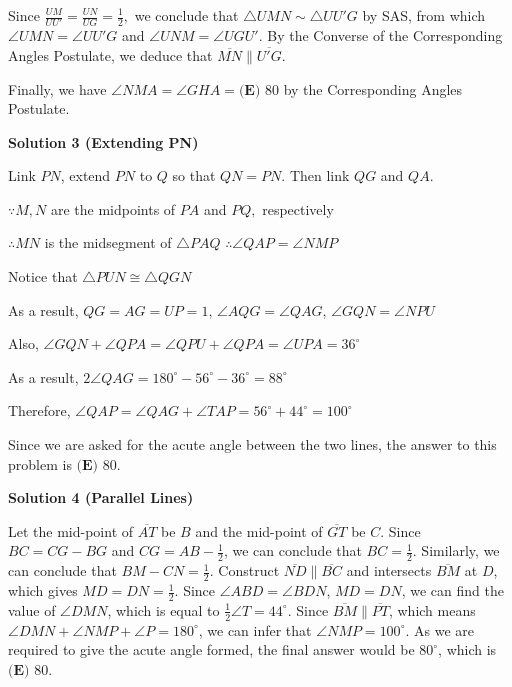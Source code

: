 \begin{enumerate}
 Since $\frac{UM}{UU'}=\frac{UN}{UG}=\frac12,$ we conclude that $\triangle UMN\sim\triangle UU'G$ by SAS, from which $\angle UMN=\angle UU'G$ and $\angle UNM=\angle UGU'.$ By the Converse of the Corresponding Angles Postulate, we deduce that $\overline{MN}\parallel\overline{U'G}.$

 Finally, we have $\angle NMA=\angle GHA=\boxed{\textbf{(E) } 80}$ by the Corresponding Angles Postulate.

 



\textbf{Solution 3 (Extending PN)}

Link $PN$, extend $PN$ to $Q$ so that $QN=PN$. Then link $QG$ and $QA$. 

 $\because M,N$ are the midpoints of $PA$ and $PQ,$ respectively

 $\therefore MN$ is the midsegment of $\bigtriangleup PAQ$
$\therefore \angle QAP=\angle NMP$

 Notice that $\bigtriangleup PUN\cong \bigtriangleup QGN$

 As a result, $QG=AG=UP=1$, $\angle AQG=\angle QAG$, $\angle GQN=\angle NPU$

 Also, $\angle GQN+\angle QPA=\angle QPU+\angle QPA=\angle UPA=36^{\circ}$

 As a result, $2\angle QAG=180^{\circ}-56^{\circ}-36^{\circ}=88^{\circ}$

 Therefore, $\angle QAP=\angle QAG+\angle TAP=56^{\circ}+44^{\circ}=100^{\circ}$

 Since we are asked for the acute angle between the two lines, the answer to this problem is $\boxed{\textbf{(E) } 80}$.

 



\textbf{Solution 4 (Parallel Lines)}

Let the mid-point of $\overline{AT}$ be $B$ and the mid-point of $\overline{GT}$ be $C$. Since $BC=CG-BG$ and $CG=AB-\frac{1}{2}$, we can conclude that $BC=\frac{1}{2}$. Similarly, we can conclude that $BM-CN=\frac{1}{2}$. Construct $\overline{ND}\parallel\overline{BC}$ and intersects $\overline{BM}$ at $D$, which gives $MD=DN=\frac{1}{2}$. Since $\angle{ABD}=\angle{BDN}$, $MD=DN$, we can find the value of $\angle{DMN}$, which is equal to $\frac{1}{2}\angle T=44^{\circ}$. Since $\overline{BM}\parallel\overline{PT}$, which means $\angle{DMN}+\angle{NMP}+\angle{P}=180^{\circ}$, we can infer that $\angle{NMP}=100^{\circ}$. As we are required to give the acute angle formed, the final answer would be $80^{\circ}$, which is $\boxed{\textbf{(E) } 80}$.


\end{enumerate}
